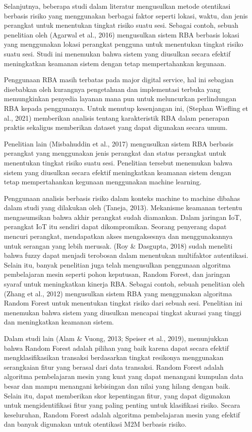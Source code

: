 Selanjutnya, beberapa studi dalam literatur mengusulkan metode otentikasi berbasis risiko yang menggunakan berbagai faktor seperti lokasi, waktu, dan jenis perangkat untuk menentukan tingkat risiko suatu sesi. Sebagai contoh, sebuah penelitian oleh (Agarwal et al., 2016) mengusulkan sistem RBA berbasis lokasi yang menggunakan lokasi perangkat pengguna untuk menentukan tingkat risiko suatu sesi. Studi ini menemukan bahwa sistem yang diusulkan secara efektif meningkatkan keamanan sistem dengan tetap mempertahankan kegunaan.

Penggunaan RBA masih terbatas pada major digital service, hal ini sebagian disebabkan oleh kurangnya pengetahuan dan implementasi terbuka yang memungkinkan penyedia layanan mana pun untuk meluncurkan perlindungan RBA kepada penggunanya. Untuk menutup kesenjangan ini, (Stephan Wiefling et al., 2021) memberikan analisis tentang karakteristik RBA dalam penerapan praktis sekaligus memberikan dataset yang dapat digunakan secara umum.

Penelitian lain (Misbahuddin et al., 2017) mengusulkan sistem RBA berbasis perangkat yang menggunakan jenis perangkat dan status perangkat untuk menentukan tingkat risiko suatu sesi. Penelitian tersebut menemukan bahwa sistem yang diusulkan secara efektif meningkatkan keamanan sistem dengan tetap mempertahankan kegunaan menggunakan machine learning.

Penggunaan analisis berbasis risiko dalam konteks machine to machine dibahas dalam studi yang dilakukan oleh (Taneja, 2013). Mekanisme keamanan tertentu mengasumsikan bahwa akhir perangkat sudah diamankan. Dalam jaringan IoT, perangkat IoT itu sendiri dapat dikompromikan. Seorang penyerang dapat mencuri perangkat, mendapatkan akses mengaksesnya dan menggunakannya untuk serangan yang lebih merusak. (Roy \& Dasgupta, 2018) sudah meneliti bahwa fuzzy dapat menjadi terobosan dalam menentukan multifaktor autentikasi. Selain itu, banyak penelitian juga telah mengusulkan penggunaan algoritma pembelajaran mesin seperti pohon keputusan, Random Forest, dan jaringan syaraf untuk meningkatkan kinerja RBA. Sebagai contoh, sebuah penelitian oleh (Zhang et al., 2012) mengusulkan sistem RBA yang menggunakan algoritma Random Forest untuk menentukan tingkat risiko dari sebuah sesi. Penelitian ini menemukan bahwa sistem yang diusulkan mencapai tingkat akurasi yang tinggi dan meningkatkan keamanan sistem. 

Dalam studi lain (Alam \& Vuong, 2013; Speiser et al., 2019), menunjukkan bahwa Random Forest adalah pilihan yang baik karena dapat secara efektif mengklasifikasikan transaksi berdasarkan tingkat resikonya menggunakan serangkaian fitur yang berasal dari data transaksi. Random Forest adalah algoritma pembelajaran mesin yang kuat yang dapat menangani kumpulan data besar dan mampu menangani kebisingan dan nilai yang hilang dengan baik. Selain itu, dapat memberikan skor kepentingan fitur, yang dapat digunakan untuk mengidentifikasi fitur yang paling penting untuk klasifikasi risiko. Secara keseluruhan, Random Forest adalah algoritma pembelajaran mesin yang efektif dan banyak digunakan untuk otentikasi M2M berbasis risiko.

